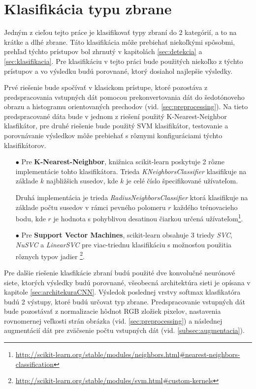 
\section{Klasifikácia typu zbrane}
Jedným z cieľou tejto práce je klasifikovať typy zbraní do 2 kategórií, a to na krátke a dlhé zbrane.
Táto klasifikácia môže prebiehať niekoľkými spôsobmi, prehľad týchto prístupov bol zhrnutý v kapitolách \ref{sec:detekcia} a \ref{sec:klasifikacia}.
Pre klasifikáciu v tejto práci bude použitých niekoľko z týchto prístupov a vo výsledku budú porovnané, ktorý dosiahol najlepšie výsledky.

Prvé riešenie bude spočívať v klasickom prístupe, ktoré pozostáva z predspracovania vstupných dát pomocou prekonvertovania dát do šedotónoveho obrazu a histogramu orientovaných prechodov (vid. \ref{sec:preprocessing}).
Na tieto predspracované dáta bude v jednom z riešení použitý K-Nearest-Neighbor klasfikátor, pre druhé riešenie bude použitý SVM klasifikátor, testovanie
    a porovnávanie výsledkov môže prebiehať s rôznymi konfiguráciami týchto klasifikátorov.
\begin{enumerate}
    \item[$\bullet$] Pre \textbf{K-Nearest-Neighbor}, knižnica scikit-learn poskytuje 2 rôzne implementácie tohto klasifikátora.
    Trieda \textit{KNeighborsClassifier} klasifikuje na základe $k$ najbližšich susedov, kde $k$ je celé číslo špecifikované užívateľom.
    
    Druhá implementácia je trieda \textit{RadiusNeighborsClassifier} ktorá klasifikuje na základe počtu susedov v rámci pevného polomeru $r$ každého trénovacieho bodu,
        kde $r$ je hodnota s pohyblivou desatinou čiarkou určená užívateľom\footnote{\url{http://scikit-learn.org/stable/modules/neighbors.html\#nearest-neighbors-classification}}.
    \item[$\bullet$] Pre \textbf{Support Vector Machines}, scikit-learn obsahuje 3 triedy \textit{SVC}, \textit{NuSVC} a \textit{LinearSVC} pre viac-triednu
        klasifikáciu s možnosťou použitia rôznych typov jadier \footnote{\url{http://scikit-learn.org/stable/modules/svm.html\#custom-kernels}}.
\end{enumerate}

Pre dalšie riešenie klasfikácie zbraní budú použité dve konvolučné neurónové siete, ktorých výsledky budú porovnané, všeobecná architektúra sieti je opísana v kapitole \ref{sec:architekuraCNN}.
Výsledok poslednej vrstvy softmax klasfikatóra budú 2 výstupy, ktoré budú určovat typ zbrane.
Predspracovanie vstupných dát bude pozostávať z normalizacie hôdnot RGB zložiek pixelov, nastavenia rovnomernej veľkosti strán obrázka (vid. \ref{sec:preprocessing})
    a následnej augmentácií dát pre zväčsenie počtu vstupných dát (vid. \ref{subsec:augmentacia}).
